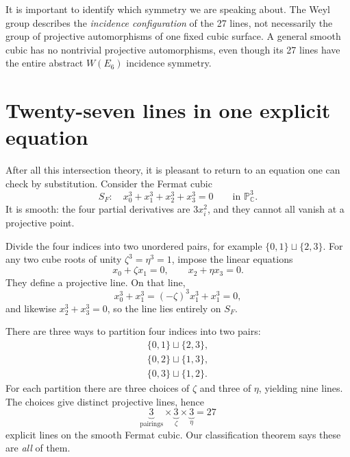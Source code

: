 It is important to identify which symmetry we are speaking about. The Weyl group describes the \emph{incidence configuration} of the 27 lines, not necessarily the group of projective automorphisms of one fixed cubic surface. A general smooth cubic has no nontrivial projective automorphisms, even though its 27 lines have the entire abstract \(W(E_6)\) incidence symmetry.

\section{Twenty-seven lines in one explicit equation}

After all this intersection theory, it is pleasant to return to an equation one can check by substitution. Consider the Fermat cubic
\begin{equation}
 S_F:\quad x_0^3+x_1^3+x_2^3+x_3^3=0
 \qquad\text{in }\mathbb P^3_{\mathbb C}.
 \label{eq:N20261109-fermat}
\end{equation}
It is smooth: the four partial derivatives are \(3x_i^2\), and they cannot all vanish at a projective point.

Divide the four indices into two unordered pairs, for example
\(\{0,1\}\sqcup\{2,3\}\). For any two cube roots of unity
\(\zeta^3=\eta^3=1\), impose the linear equations
\begin{equation}
 x_0+\zeta x_1=0,\qquad x_2+\eta x_3=0.
 \label{eq:N20261109-fermat-lines}
\end{equation}
They define a projective line. On that line,
\[
 x_0^3+x_1^3=(-\zeta)^3x_1^3+x_1^3=0,
\]
and likewise \(x_2^3+x_3^3=0\), so the line lies entirely on \(S_F\).

There are three ways to partition four indices into two pairs:
\[
 \begin{gathered}
 \{0,1\}\sqcup\{2,3\},\\
 \{0,2\}\sqcup\{1,3\},\\
 \{0,3\}\sqcup\{1,2\}.
 \end{gathered}
\]
For each partition there are three choices of \(\zeta\) and three of \(\eta\), yielding nine lines. The choices give distinct projective lines, hence
\begin{equation}
 \underbrace{3}_{\text{pairings}}\times
 \underbrace{3}_{\zeta}\times
 \underbrace{3}_{\eta}
 =27
 \label{eq:N20261109-fermat-count}
\end{equation}
explicit lines on the smooth Fermat cubic. Our classification theorem says these are \emph{all} of them.

